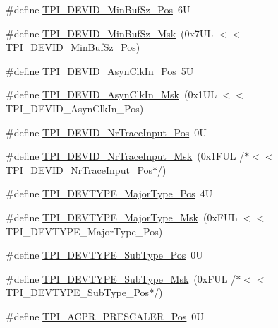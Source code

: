 \begin{DoxyCompactItemize}
\#define \mbox{\hyperlink{group___c_m_s_i_s___t_p_i_ga3f7da5de2a34be41a092e5eddd22ac4d}{T\+P\+I\+\_\+\+D\+E\+V\+I\+D\+\_\+\+Min\+Buf\+Sz\+\_\+\+Pos}}~6U
\item 
\#define \mbox{\hyperlink{group___c_m_s_i_s___t_p_i_ga939e068ff3f1a65b35187ab34a342cd8}{T\+P\+I\+\_\+\+D\+E\+V\+I\+D\+\_\+\+Min\+Buf\+Sz\+\_\+\+Msk}}~(0x7\+U\+L $<$$<$ T\+P\+I\+\_\+\+D\+E\+V\+I\+D\+\_\+\+Min\+Buf\+Sz\+\_\+\+Pos)
\item 
\#define \mbox{\hyperlink{group___c_m_s_i_s___t_p_i_gab382b1296b5efd057be606eb8f768df8}{T\+P\+I\+\_\+\+D\+E\+V\+I\+D\+\_\+\+Asyn\+Clk\+In\+\_\+\+Pos}}~5U
\item 
\#define \mbox{\hyperlink{group___c_m_s_i_s___t_p_i_gab67830557d2d10be882284275025a2d3}{T\+P\+I\+\_\+\+D\+E\+V\+I\+D\+\_\+\+Asyn\+Clk\+In\+\_\+\+Msk}}~(0x1\+U\+L $<$$<$ T\+P\+I\+\_\+\+D\+E\+V\+I\+D\+\_\+\+Asyn\+Clk\+In\+\_\+\+Pos)
\item 
\#define \mbox{\hyperlink{group___c_m_s_i_s___t_p_i_ga80ecae7fec479e80e583f545996868ed}{T\+P\+I\+\_\+\+D\+E\+V\+I\+D\+\_\+\+Nr\+Trace\+Input\+\_\+\+Pos}}~0U
\item 
\#define \mbox{\hyperlink{group___c_m_s_i_s___t_p_i_gabed454418d2140043cd65ec899abd97f}{T\+P\+I\+\_\+\+D\+E\+V\+I\+D\+\_\+\+Nr\+Trace\+Input\+\_\+\+Msk}}~(0x1\+F\+U\+L /$\ast$$<$$<$ T\+P\+I\+\_\+\+D\+E\+V\+I\+D\+\_\+\+Nr\+Trace\+Input\+\_\+\+Pos$\ast$/)
\item 
\#define \mbox{\hyperlink{group___c_m_s_i_s___t_p_i_ga69c4892d332755a9f64c1680497cebdd}{T\+P\+I\+\_\+\+D\+E\+V\+T\+Y\+P\+E\+\_\+\+Major\+Type\+\_\+\+Pos}}~4U
\item 
\#define \mbox{\hyperlink{group___c_m_s_i_s___t_p_i_gaecbceed6d08ec586403b37ad47b38c88}{T\+P\+I\+\_\+\+D\+E\+V\+T\+Y\+P\+E\+\_\+\+Major\+Type\+\_\+\+Msk}}~(0x\+F\+U\+L $<$$<$ T\+P\+I\+\_\+\+D\+E\+V\+T\+Y\+P\+E\+\_\+\+Major\+Type\+\_\+\+Pos)
\item 
\#define \mbox{\hyperlink{group___c_m_s_i_s___t_p_i_ga0c799ff892af5eb3162d152abc00af7a}{T\+P\+I\+\_\+\+D\+E\+V\+T\+Y\+P\+E\+\_\+\+Sub\+Type\+\_\+\+Pos}}~0U
\item 
\#define \mbox{\hyperlink{group___c_m_s_i_s___t_p_i_ga5b2fd7dddaf5f64855d9c0696acd65c1}{T\+P\+I\+\_\+\+D\+E\+V\+T\+Y\+P\+E\+\_\+\+Sub\+Type\+\_\+\+Msk}}~(0x\+F\+U\+L /$\ast$$<$$<$ T\+P\+I\+\_\+\+D\+E\+V\+T\+Y\+P\+E\+\_\+\+Sub\+Type\+\_\+\+Pos$\ast$/)
\item 
\#define \mbox{\hyperlink{group___c_m_s_i_s___t_p_i_ga5a82d274eb2df8b0c92dd4ed63535928}{T\+P\+I\+\_\+\+A\+C\+P\+R\+\_\+\+P\+R\+E\+S\+C\+A\+L\+E\+R\+\_\+\+Pos}}~0U
$$
\end{DoxyCompactItemize}
